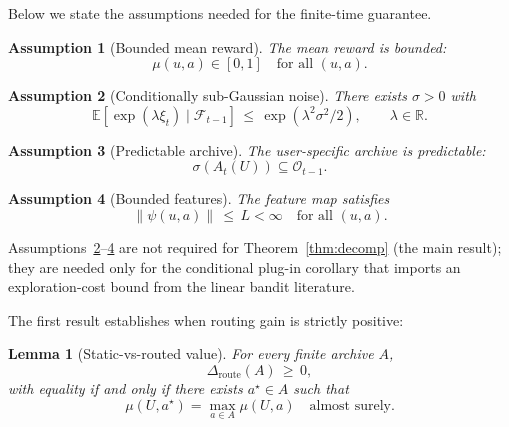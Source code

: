 \documentclass{article} %
\newtheorem{lemma}[theorem]{Lemma}
\newtheorem{assumption}{Assumption}
\providecommand{\E}{\mathbb{E}}
\begin{document}
Below we state the assumptions needed for the finite-time guarantee.

\begin{assumption}[Bounded mean reward]
\label{ass:bounded}
The mean reward is bounded:
\begin{equation}
\label{eq:ass-bounded}
\mu(u,a) \in [0,1] \quad \text{for all } (u,a).
\end{equation}
\end{assumption}

\begin{assumption}[Conditionally sub-Gaussian noise]
\label{ass:subg}
There exists $\sigma > 0$ with
\begin{equation}
\label{eq:ass-subg}
\E\!\left[\exp(\lambda \xi_t) \mid \mathcal{F}_{t-1}\right] \,\le\, \exp(\lambda^2 \sigma^2 / 2), \qquad \lambda \in \mathbb{R}.
\end{equation}
\end{assumption}

\begin{assumption}[Predictable archive]
\label{ass:predictable}
The user-specific archive is predictable:
\begin{equation}
\label{eq:ass-pred}
\sigma(A_t(U)) \subseteq \mathcal{O}_{t-1}.
\end{equation}
\end{assumption}

\begin{assumption}[Bounded features]
\label{ass:bounded-feat}
The feature map satisfies
\begin{equation}
\label{eq:ass-feat}
\|\psi(u,a)\| \,\le\, L < \infty \quad \text{for all } (u,a).
\end{equation}
\end{assumption}

Assumptions~\ref{ass:subg}--\ref{ass:bounded-feat} are not required for Theorem~\ref{thm:decomp} (the main result); they are needed only for the conditional plug-in corollary that imports an exploration-cost bound from the linear bandit literature.

\label{sec:method-lem-het}

The first result establishes when routing gain is strictly positive:

\begin{lemma}[Static-vs-routed value]
\label{lem:hetero}
For every finite archive $A$,
\begin{equation}
\label{eq:lem-hetero}
\Delta_{\mathrm{route}}(A) \,\ge\, 0,
\end{equation}
with equality if and only if there exists $a^\star \in A$ such that
\begin{equation}
\label{eq:lem-hetero-eq}
\mu(U, a^\star) = \max_{a \in A} \mu(U,a) \quad \text{almost surely.}
\end{equation}
\end{lemma}
\end{document}
